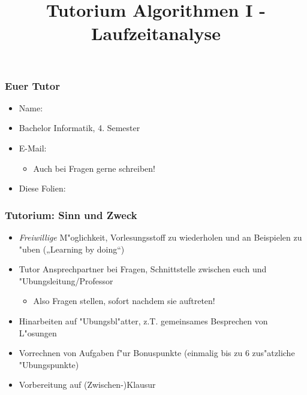 \documentclass[t]{beamer}
\title[]{Tutorium Algorithmen I - Laufzeitanalyse}
\subtitle{\authorName}
\author[]{\authorName}
\institute[]{INSTITUT FÜR THEORETISCHE INFORMATIK, PROF. SANDERS}
\begin{document}
\begin{frame}
  \maketitle
\end{frame}

\begin{frame}
  \frametitle{Euer Tutor}
  \begin{itemize}
    \item Name: \authorName
    \item Bachelor Informatik, 4. Semester
    \item E-Mail: \authorEmail
      \begin{itemize}
      \item Auch bei Fragen gerne schreiben!
      \end{itemize}
    \item Diese Folien: \authorHomepage
  \end{itemize}
\end{frame}

\begin{frame}
  \frametitle{Tutorium: Sinn und Zweck}
  \begin{itemize}
    \item \emph{Freiwillige} M"oglichkeit, Vorlesungsstoff zu wiederholen und
          an Beispielen zu "uben („Learning by doing“)
    \item Tutor Ansprechpartner bei Fragen, Schnittstelle zwischen euch und
          "Ubungsleitung/Professor
      \begin{itemize}
      \item Also Fragen stellen, sofort nachdem sie auftreten!
      \end{itemize}
    \item Hinarbeiten auf "Ubungsbl"atter, z.T. gemeinsames Besprechen von L"osungen
    \item Vorrechnen von Aufgaben f"ur Bonuspunkte
          (einmalig bis zu 6 zus"atzliche "Ubungspunkte)
    \item Vorbereitung auf (Zwischen-)Klausur
  \end{itemize}
\end{frame}
\end{document}
